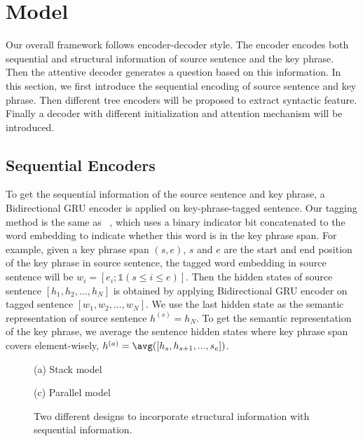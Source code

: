 \section{Model}
Our overall framework follows encoder-decoder style. The encoder encodes both sequential and structural information of source sentence and the key phrase. Then the attentive decoder generates a question based on this information. In this section, we first introduce the sequential encoding of source sentence and key phrase. Then different tree encoders will be proposed to extract syntactic feature. Finally a decoder with different initialization and attention mechanism will be introduced.

\subsection{Sequential Encoders}
To get the sequential information of the source sentence and key phrase, a Bidirectional GRU encoder is applied on key-phrase-tagged sentence. Our tagging method is the same as ~\cite{zhou2017neural}, which uses a binary indicator bit concatenated to the word embedding to indicate whether this word is in the key phrase span. For example, given a key phrase span $(s, e)$, $s$ and $e$ are the start and end position of the key phrase in source sentence, the tagged word embedding in source sentence will be $w_i=[e_i; \mathds{1}(s\leq i\leq e)]$. Then the hidden states of source sentence $[h_1,h_2,...,h_N]$ is obtained by applying Bidirectional GRU encoder on tagged sentence $[w_1,w_2,...,w_N]$. We use the last hidden state as the semantic representation of source sentence $h^{(s)}=h_N$. To get the semantic representation of the key phrase, we average the sentence hidden states where key phrase span covers element-wisely, $h^{(a)}=\avg([h_s,h_{s+1},...,s_e])$.

\begin{figure}[t]
\begin{minipage}[b]{0.4\linewidth}
  \centering
  \centerline{(a) Stack model}\medskip
\end{minipage}
\hfill
\begin{minipage}[b]{0.5\linewidth}
  \centering
{}
  \centerline{(c) Parallel model}\medskip
\end{minipage}
%
\caption{Two different designs to incorporate structural information with sequential information.}
\label{fig:architecture}
\end{figure}

